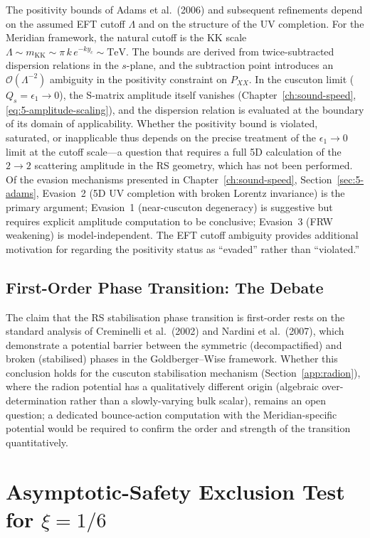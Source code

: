 The positivity bounds of Adams et al.~(2006) and subsequent refinements depend on the assumed EFT cutoff $\Lambda$ and on the structure of the UV completion. For the Meridian framework, the natural cutoff is the KK scale $\Lambda \sim m_\mathrm{KK} \sim \pi\,k\,e^{-ky_c} \sim \mathrm{TeV}$. The bounds are derived from twice-subtracted dispersion relations in the $s$-plane, and the subtraction point introduces an $\mathcal{O}(\Lambda^{-2})$ ambiguity in the positivity constraint on $P_{XX}$. In the cuscuton limit ($Q_s = \epsilon_1 \to 0$), the S-matrix amplitude itself vanishes (Chapter~\ref{ch:sound-speed}, \eqref{eq:5-amplitude-scaling}), and the dispersion relation is evaluated at the boundary of its domain of applicability. Whether the positivity bound is violated, saturated, or inapplicable thus depends on the precise treatment of the $\epsilon_1 \to 0$ limit at the cutoff scale---a question that requires a full 5D calculation of the $2 \to 2$ scattering amplitude in the RS geometry, which has not been performed. Of the evasion mechanisms presented in Chapter~\ref{ch:sound-speed}, Section~\ref{sec:5-adams}, Evasion~2 (5D UV completion with broken Lorentz invariance) is the primary argument; Evasion~1 (near-cuscuton degeneracy) is suggestive but requires explicit amplitude computation to be conclusive; Evasion~3 (FRW weakening) is model-independent. The EFT cutoff ambiguity provides additional motivation for regarding the positivity status as ``evaded'' rather than ``violated.''

\subsection{First-Order Phase Transition: The Debate}
\label{app:first-order-debate}

The claim that the RS stabilisation phase transition is first-order rests on the standard analysis of Creminelli et al.~(2002) and Nardini et al.~(2007), which demonstrate a potential barrier between the symmetric (decompactified) and broken (stabilised) phases in the Goldberger--Wise framework. Whether this conclusion holds for the cuscuton stabilisation mechanism (Section~\ref{app:radion}), where the radion potential has a qualitatively different origin (algebraic over-determination rather than a slowly-varying bulk scalar), remains an open question; a dedicated bounce-action computation with the Meridian-specific potential would be required to confirm the order and strength of the transition quantitatively.

\section{Asymptotic-Safety Exclusion Test for \texorpdfstring{$\xi = 1/6$}{xi = 1/6}}
\label{app:eichhorn-xi}

